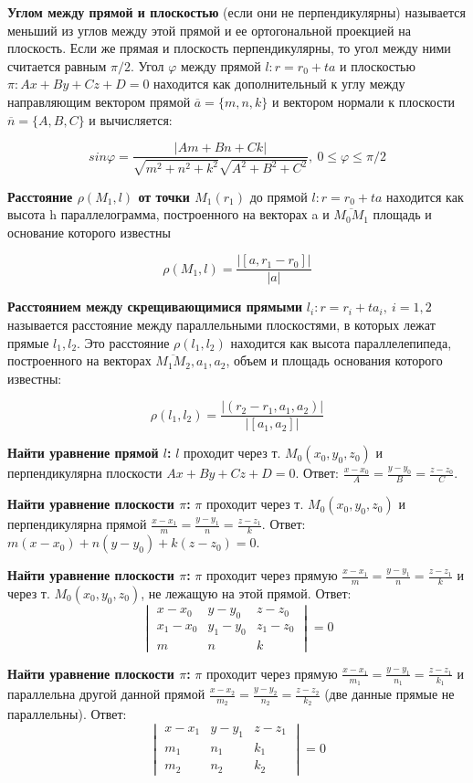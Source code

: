 \textbf{Углом между прямой и плоскостью} (если они не перпендикулярны) называется меньший из углов между этой прямой и ее ортогональной проекцией на плоскость. 
Если же прямая и плоскость перпендикулярны, то угол между ними считается равным $\pi / 2$. 
Угол $\varphi$ между прямой $l: r = r_0 + ta$ и плоскостью $\pi: Ax + By + Cz + D = 0$ находится как
дополнительный к углу между направляющим вектором прямой $\overline{a} = \{m, n, k\}$ 
и вектором нормали к плоскости $\overline{n} = \{A, B, C\}$ и вычисляется:

$$sin\varphi = \frac{|Am + Bn + Ck|}{\sqrt{m^2 + n^2 + k^2}\sqrt{A^2 + B^2 + C^2}}, ~ 0 \leq \varphi \leq \pi / 2$$

\textbf{Расстояние $\rho(M_1, l)$ от точки $M_1(r_1)$} до прямой $l: r = r_0 + ta$ находится как высота h параллелограмма, построенного на векторах a и $\overline{M_0M_1}$ площадь и основание которого известны

$$\rho(M_1, l) = \frac{|[a, r_1 - r_0]|}{|a|}$$

\textbf{Расстоянием между скрещивающимися прямыми} $l_i: r = r_i + ta_i, ~ i = 1,2$ называется расстояние между параллельными плоскостями, в которых лежат прямые $l_1, l_2$. Это расстояние $\rho(l_1, l_2)$ находится как высота параллелепипеда, построенного на векторах $\overline{M_1M_2}, a_1, a_2$, объем и площадь основания которого известны:

$$\rho(l_1, l_2) = \frac{|(r_2 - r_1, a_1, a_2)|}{|[a_1, a_2]|}$$

\textbf{Найти уравнение прямой $l$:} $l$  проходит через т. $M_0(x_0,y_0,z_0)$ и перпендикулярна плоскости $Ax+By+Cz+D=0$. Ответ: $\frac{x-x_0}{A} = \frac{y-y_0}{B} = \frac{z-z_0}{C}$.

\textbf{Найти уравнение плоскости $\pi$:} $\pi$ проходит через т. $M_0(x_0,y_0,z_0)$ и перпендикулярна прямой $\frac{x-x_1}{m} = \frac{y-y_1}{n} = \frac{z-z_1}{k}$. Ответ: $m(x-x_0)+n(y-y_0)+k(z-z_0) = 0$.

\textbf{Найти уравнение плоскости $\pi$:} $\pi$ проходит через прямую $\frac{x-x_1}{m} = \frac{y-y_1}{n} = \frac{z-z_1}{k}$ и через т. $M_0(x_0,y_0,z_0)$, не лежащую на этой прямой. Ответ: $$\begin{vmatrix} x-x_0 & y-y_0 & z-z_0\\ x_1-x_0 & y_1-y_0 & z_1-z_0 \\ m & n & k \end{vmatrix} = 0 $$

\textbf{Найти уравнение плоскости $\pi$:} $\pi$ проходит через прямую $\frac{x-x_1}{m_1} = \frac{y-y_1}{n_1} = \frac{z-z_1}{k_1}$ и параллельна другой данной прямой $\frac{x-x_2}{m_2} = \frac{y-y_2}{n_2} = \frac{z-z_2}{k_2}$ (две данные прямые не параллельны). Ответ: $$\begin{vmatrix} x-x_1 & y-y_1 & z-z_1\\ m_1 & n_1 & k_1 \\ m_2 & n_2 & k_2 \end{vmatrix} = 0 $$

